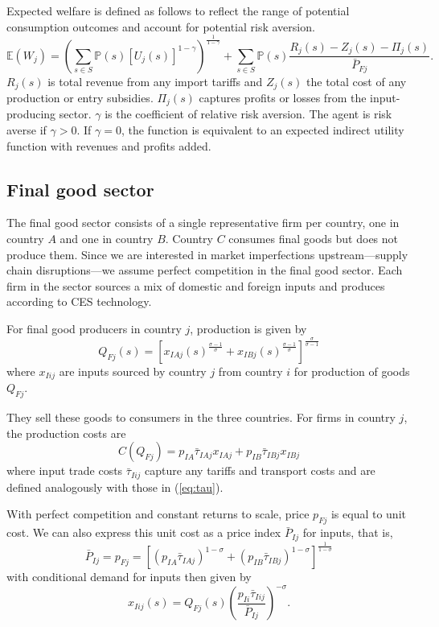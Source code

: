 \documentclass{article}
\begin{document}
Expected welfare is defined as follows to reflect the range of potential consumption outcomes and account for potential risk aversion.
\begin{equation} \label{eq:welfare}
    \mathbb{E} \left( W_j \right) = \left( \sum_{s \in S} \mathbb{P}(s) \left[ U_j(s) \right]^{1 - \gamma} \right)^{\frac{1}{1 - \gamma}} + \sum_{s \in S} \mathbb{P}(s)\frac{R_j(s) - Z_j(s) - \Pi_j(s)}{\bar{P}_{Fj}}.
\end{equation}
$R_j(s)$ is total revenue from any import tariffs and $Z_j(s)$ the total cost of any production or entry subsidies. $\Pi_j(s)$ captures profits or losses from the input-producing sector. $\gamma$ is the coefficient of relative risk aversion. The agent is risk averse if $\gamma > 0$. If $\gamma = 0$, the function is equivalent to an expected indirect utility function with revenues and profits added.

\subsection{Final good sector}

The final good sector consists of a single representative firm per country, one in country $A$ and one in country $B$. Country $C$ consumes final goods but does not produce them. Since we are interested in market imperfections upstream---supply chain disruptions---we assume perfect competition in the final good sector. Each firm in the sector sources a mix of domestic and foreign inputs and produces according to CES technology. 

For final good producers in country $j$, production is given by
\begin{equation} \label{eq:prod_final}
    Q_{Fj}(s) = \left[ x_{IAj}(s)^\frac{\sigma-1}{\sigma} + x_{IBj}(s)^\frac{\sigma-1}{\sigma} \right]^\frac{\sigma}{\sigma-1}
\end{equation}
where $x_{Iij}$ are inputs sourced by country $j$ from country $i$ for production of goods $Q_{Fj}$. 

They sell these goods to consumers in the three countries. For firms in country $j$, the production costs are
\begin{equation}
    C(Q_{Fj}) = p_{IA} \bar{\tau}_{IAj} x_{IAj} + p_{IB} \bar{\tau}_{IBj} x_{IBj}
\end{equation}
where input trade costs $\bar{\tau}_{Iij}$ capture any tariffs and transport costs and are defined analogously with those in (\ref{eq:tau}).

With perfect competition and constant returns to scale, price $p_{Fj}$ is equal to unit cost. We can also express this unit cost as a price index $\bar{P}_{Ij}$ for inputs, that is,
\begin{equation}
    \bar{P}_{Ij} = p_{Fj} = \left[ ( p_{IA} \bar{\tau}_{IAj} )^{1 - \sigma} + ( p_{IB} \bar{\tau}_{IBj} )^{1 - \sigma} \right]^{\frac{1}{1 - \sigma}}
\end{equation}
with conditional demand for inputs then given by
\begin{equation} \label{eq:input_demand}
    x_{Iij}(s) = Q_{Fj}(s) \left( \frac{p_{Ii} \bar{\tau}_{Iij}}{\bar{P}_{Ij}} \right)^{-\sigma}.
\end{equation}
\end{document}
